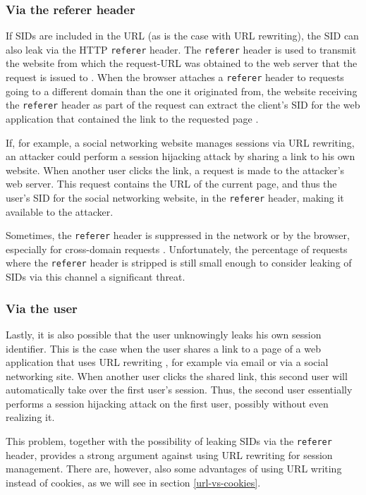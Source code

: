 \subsubsection{Via the referer header}\label{leaking-via-referer}

If SIDs are included in the URL (as is the case with URL rewriting), the SID can also leak via the HTTP \texttt{referer} header. The \texttt{referer} header is used to transmit the website from which the request-URL was obtained to the web server that the request is issued to \cite{rfc2616}. When the browser attaches a \texttt{referer} header to requests going to a different domain than the one it originated from, the website receiving the \texttt{referer} header as part of the request can extract the client's SID for the web application that contained the link to the requested page \cite{Fu2001}.

If, for example, a social networking website manages sessions via URL rewriting, an attacker could perform a session hijacking attack by sharing a link to his own website. When another user clicks the link, a request is made to the attacker's web server. This request contains the URL of the current page, and thus the user's SID for the social networking website, in the \texttt{referer} header, making it available to the attacker.

Sometimes, the \texttt{referer} header is suppressed in the network or by the browser, especially for cross-domain requests \cite{Barth2008}. Unfortunately, the percentage of requests where the \texttt{referer} header is stripped is still small enough to consider leaking of SIDs via this channel a significant threat.

\subsubsection{Via the user}\label{leaking-via-user}

Lastly, it is also possible that the user unknowingly leaks his own session identifier. This is the case when the user shares a link to a page of a web application that uses URL rewriting \cite{Johnston2004}, for example via email or via a social networking site. When another user clicks the shared link, this second user will automatically take over the first user's session. Thus, the second user essentially performs a session hijacking attack on the first user, possibly without even realizing it.

This problem, together with the possibility of leaking SIDs via the \texttt{referer} header, provides a strong argument against using URL rewriting for session management. There are, however, also some advantages of using URL writing instead of cookies, as we will see in section \ref{url-vs-cookies}.

